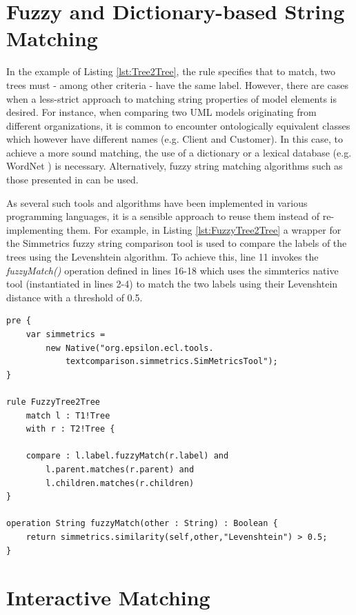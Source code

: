 \section{Fuzzy and Dictionary-based String Matching}
\label{sec:FuzzyComparison}

In the example of Listing \ref{lst:Tree2Tree}, the rule specifies that to match, two trees must - among other criteria - have the same label. However, there are cases when a less-strict approach to matching string properties of model elements is desired. For instance, when comparing two UML models originating from different organizations, it is common to encounter ontologically equivalent classes which however have different names (e.g. Client and Customer). In this case, to achieve a more sound matching, the use of a dictionary or a lexical database (e.g. WordNet \cite{Wordnet}) is necessary. Alternatively, fuzzy string matching algorithms such as those presented in \cite{FuzzyStringMatching} can be used.

As several such tools and algorithms have been implemented in various programming languages, it is a sensible approach to reuse them instead of re-implementing them. For example, in Listing \ref{lst:FuzzyTree2Tree} a wrapper for the Simmetrics \cite{Simmetrics} fuzzy string comparison tool is used to compare the labels of the trees using the Levenshtein \cite{Levenshtein} algorithm. To achieve this, line 11 invokes the \emph{fuzzyMatch()} operation defined in lines 16-18 which uses the simmterics native tool (instantiated in lines 2-4) to match the two labels using their Levenshtein distance with a threshold of 0.5.

\begin{lstlisting}[float=tbp, caption=The FuzzyTree2Tree rule, label=lst:FuzzyTree2Tree, language=ECL]
pre {
	var simmetrics = 
		new Native("org.epsilon.ecl.tools.
			textcomparison.simmetrics.SimMetricsTool"); 
}

rule FuzzyTree2Tree 
	match l : T1!Tree
	with r : T2!Tree {
	
	compare : l.label.fuzzyMatch(r.label) and 
		l.parent.matches(r.parent) and
		l.children.matches(r.children)
}

operation String fuzzyMatch(other : String) : Boolean {
	return simmetrics.similarity(self,other,"Levenshtein") > 0.5;
}\end{lstlisting}

\section{Interactive Matching}
\label{sec:InteractiveModelComparison}

